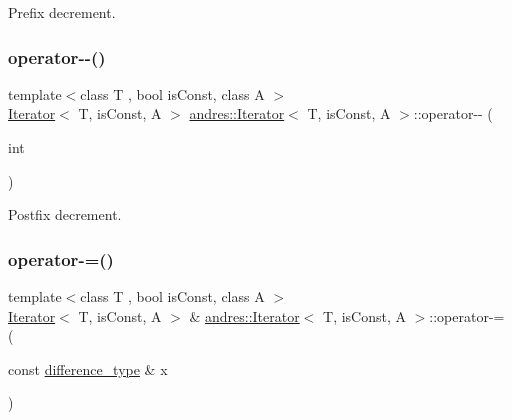 Prefix decrement. \mbox{\label{classandres_1_1Iterator_acfde3bc208623f9105a8ea0d5103aec3}} 
\subsubsection{\texorpdfstring{operator-\/-\/()}{operator--()}\hspace{0.1cm}{\footnotesize\ttfamily [2/2]}}
{\footnotesize\ttfamily template$<$class T , bool is\+Const, class A $>$ \\
\hyperlink{classandres_1_1Iterator}{Iterator}$<$ T, is\+Const, A $>$ \hyperlink{classandres_1_1Iterator}{andres\+::\+Iterator}$<$ T, is\+Const, A $>$\+::operator-\/-\/ (\begin{DoxyParamCaption}\item[{int}]{ }\end{DoxyParamCaption})\hspace{0.3cm}{\ttfamily [inline]}}

Postfix decrement. \mbox{\label{classandres_1_1Iterator_a2d9d6f6b6b9c3e1843f00b3162f9dfeb}} 
\subsubsection{\texorpdfstring{operator-\/=()}{operator-=()}}
{\footnotesize\ttfamily template$<$class T , bool is\+Const, class A $>$ \\
\hyperlink{classandres_1_1Iterator}{Iterator}$<$ T, is\+Const, A $>$ \& \hyperlink{classandres_1_1Iterator}{andres\+::\+Iterator}$<$ T, is\+Const, A $>$\+::operator-\/= (\begin{DoxyParamCaption}\item[{const \hyperlink{classandres_1_1Iterator_a10f8053d87b6b597d9fe011f66a240ca}{difference\+\_\+type} \&}]{x }\end{DoxyParamCaption})\hspace{0.3cm}{\ttfamily [inline]}}

\mbox{\label{classandres_1_1Iterator_a1299459201b748ef50d43cf871de510b}} 
